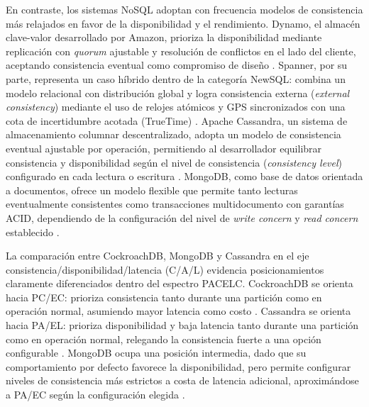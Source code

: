 \documentclass[12pt, a4paper]{article}
\begin{document}
En contraste, los sistemas NoSQL adoptan con frecuencia modelos de consistencia más relajados en favor de la disponibilidad y el rendimiento. Dynamo, el almacén clave-valor desarrollado por Amazon, prioriza la disponibilidad mediante replicación con \textit{quorum} ajustable y resolución de conflictos en el lado del cliente, aceptando consistencia eventual como compromiso de diseño \cite{decandia2007dynamo}. Spanner, por su parte, representa un caso híbrido dentro de la categoría NewSQL: combina un modelo relacional con distribución global y logra consistencia externa (\textit{external consistency}) mediante el uso de relojes atómicos y GPS sincronizados con una cota de incertidumbre acotada (TrueTime) \cite{corbett2013spanner}. Apache Cassandra, un sistema de almacenamiento columnar descentralizado, adopta un modelo de consistencia eventual ajustable por operación, permitiendo al desarrollador equilibrar consistencia y disponibilidad según el nivel de consistencia (\textit{consistency level}) configurado en cada lectura o escritura \cite{lakshman2010cassandra}. MongoDB, como base de datos orientada a documentos, ofrece un modelo flexible que permite tanto lecturas eventualmente consistentes como transacciones multidocumento con garantías ACID, dependiendo de la configuración del nivel de \textit{write concern} y \textit{read concern} establecido \cite{samala2024mongodb}.

La comparación entre CockroachDB, MongoDB y Cassandra en el eje consistencia/disponibilidad/latencia (C/A/L) evidencia posicionamientos claramente diferenciados dentro del espectro PACELC. CockroachDB se orienta hacia PC/EC: prioriza consistencia tanto durante una partición como en operación normal, asumiendo mayor latencia como costo \cite{taft2020cockroachdb}. Cassandra se orienta hacia PA/EL: prioriza disponibilidad y baja latencia tanto durante una partición como en operación normal, relegando la consistencia fuerte a una opción configurable \cite{lakshman2010cassandra}. MongoDB ocupa una posición intermedia, dado que su comportamiento por defecto favorece la disponibilidad, pero permite configurar niveles de consistencia más estrictos a costa de latencia adicional, aproximándose a PA/EC según la configuración elegida \cite{samala2024mongodb}.
\end{document}
